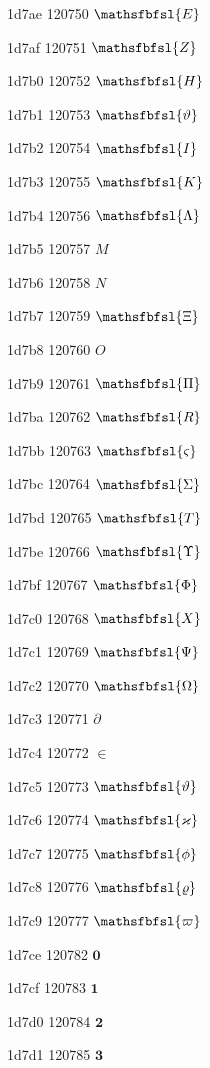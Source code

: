 \documentclass[11pt]{article}
\begin{document}
1d7ae 120750 \ensuremath{\mathsfbfsl{{E}}}

1d7af 120751 \ensuremath{\mathsfbfsl{{Z}}}

1d7b0 120752 \ensuremath{\mathsfbfsl{{H}}}

1d7b1 120753 \ensuremath{\mathsfbfsl{\vartheta}}

1d7b2 120754 \ensuremath{\mathsfbfsl{{I}}}

1d7b3 120755 \ensuremath{\mathsfbfsl{{K}}}

1d7b4 120756 \ensuremath{\mathsfbfsl{\Lambda}}

1d7b5 120757 \ensuremath{M}

1d7b6 120758 \ensuremath{N}

1d7b7 120759 \ensuremath{\mathsfbfsl{\Xi}}

1d7b8 120760 \ensuremath{O}

1d7b9 120761 \ensuremath{\mathsfbfsl{\Pi}}

1d7ba 120762 \ensuremath{\mathsfbfsl{{R}}}

1d7bb 120763 \ensuremath{\mathsfbfsl{\varsigma}}

1d7bc 120764 \ensuremath{\mathsfbfsl{\Sigma}}

1d7bd 120765 \ensuremath{\mathsfbfsl{{T}}}

1d7be 120766 \ensuremath{\mathsfbfsl{\Upsilon}}

1d7bf 120767 \ensuremath{\mathsfbfsl{\Phi}}

1d7c0 120768 \ensuremath{\mathsfbfsl{{X}}}

1d7c1 120769 \ensuremath{\mathsfbfsl{\Psi}}

1d7c2 120770 \ensuremath{\mathsfbfsl{\Omega}}

1d7c3 120771 \ensuremath{\partial}

1d7c4 120772 \ensuremath{\in}

1d7c5 120773 \ensuremath{\mathsfbfsl{\vartheta}}

1d7c6 120774 \ensuremath{\mathsfbfsl{\varkappa}}

1d7c7 120775 \ensuremath{\mathsfbfsl{\phi}}

1d7c8 120776 \ensuremath{\mathsfbfsl{\varrho}}

1d7c9 120777 \ensuremath{\mathsfbfsl{\varpi}}

1d7ce 120782 \ensuremath{\mathbf{0}}

1d7cf 120783 \ensuremath{\mathbf{1}}

1d7d0 120784 \ensuremath{\mathbf{2}}

1d7d1 120785 \ensuremath{\mathbf{3}}
\end{document}
